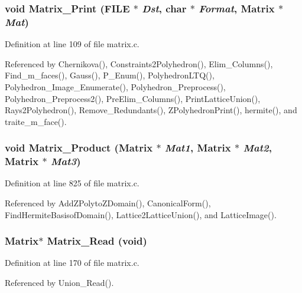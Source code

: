 \subsubsection{\setlength{\rightskip}{0pt plus 5cm}void Matrix\_\-Print (FILE $\ast$ {\em Dst}, char $\ast$ {\em Format}, Matrix $\ast$ {\em Mat})}\label{matrix_8c_a2}




Definition at line 109 of file matrix.c.

Referenced by Chernikova(), Constraints2Polyhedron(), Elim\_\-Columns(), Find\_\-m\_\-faces(), Gauss(), P\_\-Enum(), Polyhedron\-LTQ(), Polyhedron\_\-Image\_\-Enumerate(), Polyhedron\_\-Preprocess(), Polyhedron\_\-Preprocess2(), Pre\-Elim\_\-Columns(), Print\-Lattice\-Union(), Rays2Polyhedron(), Remove\_\-Redundants(), ZPolyhedron\-Print(), hermite(), and traite\_\-m\_\-face().

\subsubsection{\setlength{\rightskip}{0pt plus 5cm}void Matrix\_\-Product (Matrix $\ast$ {\em Mat1}, Matrix $\ast$ {\em Mat2}, Matrix $\ast$ {\em Mat3})}\label{matrix_8c_a12}




Definition at line 825 of file matrix.c.

Referenced by Add\-ZPolyto\-ZDomain(), Canonical\-Form(), Find\-Hermite\-Basisof\-Domain(), Lattice2Lattice\-Union(), and Lattice\-Image().

\subsubsection{\setlength{\rightskip}{0pt plus 5cm}Matrix$\ast$ Matrix\_\-Read (void)}\label{matrix_8c_a4}




Definition at line 170 of file matrix.c.

Referenced by Union\_\-Read().

